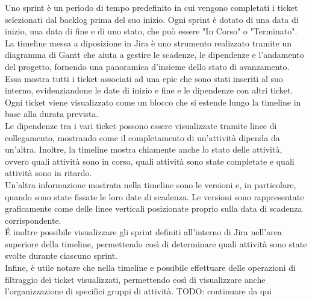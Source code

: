 Uno sprint è un periodo di tempo predefinito in cui vengono completati i ticket selezionati dal backlog prima del suo inizio. Ogni sprint è dotato di una data di inizio, una data di fine e di uno stato, che può essere "In Corso" o "Terminato".
La timeline messa a diposizione in Jira è uno strumento realizzato tramite un diagramma di Gantt che aiuta a gestire le scadenze, le dipendenze e l'andamento del progetto, fornendo una panoramica d'insieme dello stato di avanzamento.\\
Essa mostra tutti i ticket associati ad una epic che sono stati inseriti al suo interno, evidenziandone le date di inizio e fine e le dipendenze con altri ticket. Ogni ticket viene visualizzato come un blocco che si estende lungo la timeline in base alla durata prevista.\\
Le dipendenze tra i vari ticket possono essere visualizzate tramite linee di collegamento, mostrando come il completamento di un'attività dipenda da un’altra. Inoltre, la timeline mostra chiamente anche lo stato delle attività, ovvero quali attività sono in corso, quali attività sono state completate e quali attività sono in ritardo.\\
Un'altra informazione mostrata nella timeline sono le versioni e, in particolare, quando sono state fissate le loro date di scadenza. Le versioni sono rappresentate graficamente come delle linee verticali posizionate proprio sulla data di scadenza corrispondente.\\
\'E inoltre possibile visualizzare gli sprint definiti all'interno di Jira nell'area superiore della timeline, permettendo così di determinare quali attività sono state svolte durante ciascuno sprint.\\
Infine, è utile notare che nella timeline e possibile effettuare delle operazioni di filtraggio dei ticket visualizzati, permettendo così di visualizzare anche l'organizzazione di specifici gruppi di attività.
TODO: continuare da qui
